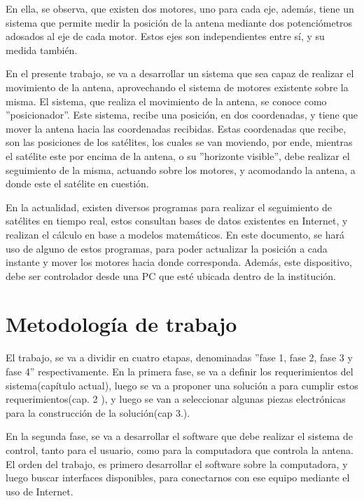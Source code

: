 En ella, se observa, que existen dos motores, uno para cada eje, además, tiene un sistema que permite medir la posición de la antena mediante dos potenciómetros adosados al eje de cada motor. Estos ejes son independientes entre sí, y su medida también. 


En el presente trabajo, se va a desarrollar un sistema que sea capaz de realizar el movimiento de la antena, aprovechando el sistema de motores existente sobre la misma. El sistema, que realiza el movimiento de la antena, se conoce como ''posicionador''. Este sistema, recibe una posición, en dos coordenadas, y tiene que mover la antena hacia las coordenadas recibidas. Estas coordenadas que recibe, son las posiciones de los satélites, los cuales se van moviendo, por ende, mientras el satélite este por encima de la antena, o su ''horizonte visible'', debe realizar el seguimiento de la misma, actuando sobre los motores, y acomodando la antena, a donde este el satélite en cuestión.

En la actualidad, existen diversos programas para realizar el seguimiento de satélites en tiempo real, estos consultan bases de datos existentes en Internet, y realizan el cálculo en base a modelos matemáticos. En este documento, se hará uso de alguno de estos programas, para poder actualizar la posición a cada instante y mover los motores hacia donde corresponda. Además, este dispositivo, debe ser controlador desde una PC que esté ubicada dentro de la institución. 

\section{Metodología de trabajo}

El trabajo, se va a dividir en cuatro etapas, denominadas ''fase 1, fase 2, fase 3 y fase 4'' respectivamente. En la primera fase, se va a definir los requerimientos del sistema(capítulo actual), luego se va a proponer una solución a para cumplir estos requerimientos(cap. 2 ), y luego se van a seleccionar algunas piezas electrónicas para la construcción de la solución(cap 3.). 

En la segunda fase, se va a desarrollar el software que debe realizar el sistema de control, tanto para el usuario, como para la computadora que controla la antena. El orden del trabajo, es primero desarrollar el software sobre la computadora, y luego buscar interfaces disponibles, para conectarnos con ese equipo mediante el uso de Internet. 



